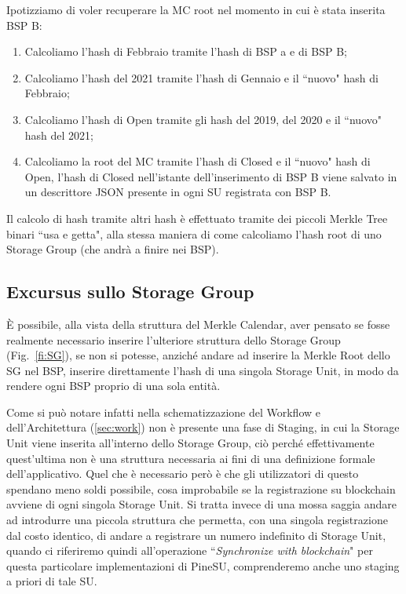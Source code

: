 Ipotizziamo di voler recuperare la MC root nel momento in cui è stata inserita BSP B:
\begin{enumerate}
    \item Calcoliamo l'hash di Febbraio tramite l'hash di BSP a e di BSP B;
    \item Calcoliamo l'hash del 2021 tramite l'hash di Gennaio e il ``nuovo" hash di Febbraio;
    \item Calcoliamo l'hash di Open tramite gli hash del 2019, del 2020 e il ``nuovo" hash del 2021;
    \item Calcoliamo la root del MC tramite l'hash di Closed e il ``nuovo" hash di Open, l'hash di Closed nell'istante dell'inserimento di BSP B viene salvato in un descrittore JSON presente in ogni SU registrata con BSP B.
\end{enumerate}
Il calcolo di hash tramite altri hash è effettuato tramite dei piccoli Merkle Tree binari ``usa e getta", alla stessa maniera di come calcoliamo l'hash root di uno Storage Group (che andrà a finire nei BSP).

\subsection{Excursus sullo Storage Group}
\label{sub:stage1}
È possibile, alla vista della struttura del Merkle Calendar, aver pensato se fosse realmente
necessario inserire l'ulteriore struttura dello Storage Group (Fig.~\ref{fi:SG}), se non si potesse,
anziché andare ad inserire la Merkle Root dello SG nel BSP, inserire direttamente
l'hash di una singola Storage Unit, in modo da rendere ogni BSP proprio di una sola entità.

Come si può notare infatti nella schematizzazione del Workflow e dell'Architettura
(\autoref{sec:work}) non è presente una fase di Staging, in cui la Storage Unit viene
inserita all'interno dello Storage Group, ciò perché effettivamente quest'ultima non è
una struttura necessaria ai fini di una definizione formale dell'applicativo.
Quel che è necessario però è che gli utilizzatori di questo spendano meno soldi possibile,
cosa improbabile se la registrazione su blockchain avviene di ogni singola Storage Unit.
Si tratta invece di una mossa saggia andare ad introdurre una piccola struttura che permetta,
con una singola registrazione dal costo identico, di andare a registrare un numero
indefinito di Storage Unit, quando ci riferiremo quindi all'operazione
``\emph{Synchronize with blockchain}" per questa particolare implementazioni di PineSU,
comprenderemo anche uno staging a priori di tale SU.

